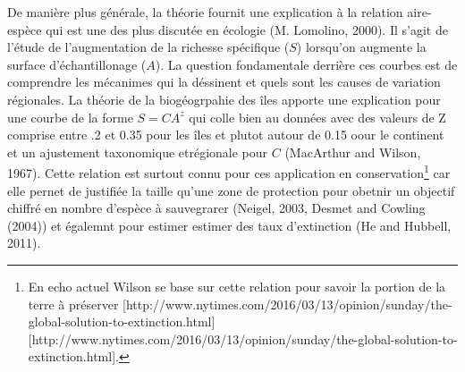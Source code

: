 De manière plus générale, la théorie fournit une explication à la
relation aire-espèce qui est une des plus discutée en écologie (M.
Lomolino, 2000). Il s'agit de l'étude de l'augmentation de la richesse
spécifique (\(S\)) lorsqu'on augmente la surface d'échantillonage
(\(A\)). La question fondamentale derrière ces courbes est de comprendre
les mécanimes qui la déssinent et quels sont les causes de variation
régionales. La théorie de la biogéogrpahie des îles apporte une
explication pour une courbe de la forme \(S=CA^z\) qui colle bien au
données avec des valeurs de Z comprise entre .2 et 0.35 pour les îles et
plutot autour de 0.15 oour le continent et un ajustement taxonomique
etrégionale pour \(C\) (MacArthur and Wilson, 1967). Cette relation est
surtout connu pour ces application en conservation\footnote{En echo
  actuel Wilson se base sur cette relation pour savoir la portion de la
  terre à préserver
  {[}http://www.nytimes.com/2016/03/13/opinion/sunday/the-global-solution-to-extinction.html{]}{[}http://www.nytimes.com/2016/03/13/opinion/sunday/the-global-solution-to-extinction.html{]}.}
car elle pernet de justifiée la taille qu'une zone de protection pour
obetnir un objectif chiffré en nombre d'espèce à sauvegrarer (Neigel,
2003, Desmet and Cowling (2004)) et égalemnt pour estimer estimer des
taux d'extinction (He and Hubbell, 2011).

